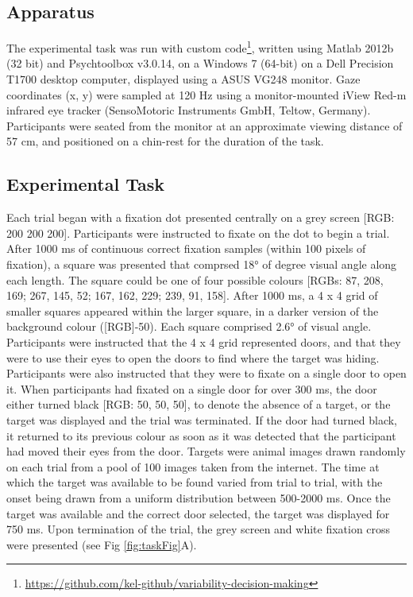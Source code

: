 \documentclass{article}
\begin{document}
\hypertarget{apparatus}{%
\subsection{Apparatus}\label{apparatus}}

The experimental task was run with custom code\footnote{\url{https://github.com/kel-github/variability-decision-making}},
written using Matlab 2012b (32 bit) and Psychtoolbox v3.0.14, on a
Windows 7 (64-bit) on a Dell Precision T1700 desktop computer, displayed
using a ASUS VG248 monitor. Gaze coordinates (x, y) were sampled at 120
Hz using a monitor-mounted iView Red-m infrared eye tracker
(SensoMotoric Instruments GmbH, Teltow, Germany). Participants were
seated from the monitor at an approximate viewing distance of 57 cm, and
positioned on a chin-rest for the duration of the task.

\hypertarget{experimental-task}{%
\subsection{Experimental Task}\label{experimental-task}}

Each trial began with a fixation dot presented centrally on a grey
screen {[}RGB: 200 200 200{]}. Participants were instructed to fixate on
the dot to begin a trial. After 1000 ms of continuous correct fixation
samples (within 100 pixels of fixation), a square was presented that
comprsed 18° of degree visual angle along each length. The square could
be one of four possible colours {[}RGBs: 87, 208, 169; 267, 145, 52;
167, 162, 229; 239, 91, 158{]}. After 1000 ms, a 4 x 4 grid of smaller
squares appeared within the larger square, in a darker version of the
background colour ({[}RGB{]}-50). Each square comprised 2.6° of visual
angle. Participants were instructed that the 4 x 4 grid represented
doors, and that they were to use their eyes to open the doors to find
where the target was hiding. Participants were also instructed that they
were to fixate on a single door to open it. When participants had
fixated on a single door for over 300 ms, the door either turned black
{[}RGB: 50, 50, 50{]}, to denote the absence of a target, or the target
was displayed and the trial was terminated. If the door had turned
black, it returned to its previous colour as soon as it was detected
that the participant had moved their eyes from the door. Targets were
animal images drawn randomly on each trial from a pool of 100 images
taken from the internet. The time at which the target was available to
be found varied from trial to trial, with the onset being drawn from a
uniform distribution between 500-2000 ms. Once the target was available
and the correct door selected, the target was displayed for 750 ms. Upon
termination of the trial, the grey screen and white fixation cross were
presented (see Fig \ref{fig:taskFig}A).
\end{document}
